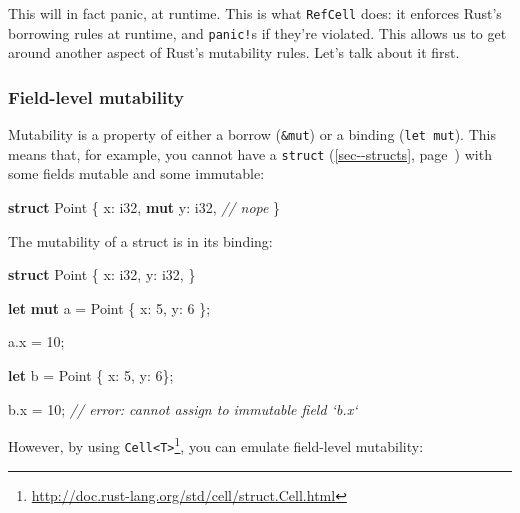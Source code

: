 \documentclass[a4paper,]{book}
\renewcommand*{\hyperref}[2][\ar]{%
  \def\ar{#2}%
  #2 (\autoref{#1}, page~\pageref{#1})}
\newenvironment{Shaded}{\begin{snugshade}}{\end{snugshade}}
\newcommand{\KeywordTok}[1]{\textcolor[rgb]{0.13,0.29,0.53}{\textbf{{#1}}}}
\newcommand{\DataTypeTok}[1]{\textcolor[rgb]{0.13,0.29,0.53}{{#1}}}
\newcommand{\DecValTok}[1]{\textcolor[rgb]{0.00,0.00,0.81}{{#1}}}
\newcommand{\CommentTok}[1]{\textcolor[rgb]{0.56,0.35,0.01}{\textit{{#1}}}}
\newcommand{\NormalTok}[1]{{#1}}
\renewcommand{\href}[2]{#2\footnote{\url{#1}}}
\begin{document}
This will in fact panic, at runtime. This is what \texttt{RefCell} does:
it enforces Rust's borrowing rules at runtime, and \texttt{panic!}s if
they're violated. This allows us to get around another aspect of Rust's
mutability rules. Let's talk about it first.

\subsubsection{Field-level mutability}\label{field-level-mutability}

Mutability is a property of either a borrow (\texttt{\&mut}) or a
binding (\texttt{let\ mut}). This means that, for example, you cannot
have a \hyperref[sec--structs]{\texttt{struct}} with some fields mutable
and some immutable:

\begin{Shaded}
\begin{Highlighting}[]
\KeywordTok{struct} \NormalTok{Point \{}
    \NormalTok{x: }\DataTypeTok{i32}\NormalTok{,}
    \KeywordTok{mut} \NormalTok{y: }\DataTypeTok{i32}\NormalTok{, }\CommentTok{// nope}
\NormalTok{\}}
\end{Highlighting}
\end{Shaded}

The mutability of a struct is in its binding:

\begin{Shaded}
\begin{Highlighting}[]
\KeywordTok{struct} \NormalTok{Point \{}
    \NormalTok{x: }\DataTypeTok{i32}\NormalTok{,}
    \NormalTok{y: }\DataTypeTok{i32}\NormalTok{,}
\NormalTok{\}}

\KeywordTok{let} \KeywordTok{mut} \NormalTok{a = Point \{ x: }\DecValTok{5}\NormalTok{, y: }\DecValTok{6} \NormalTok{\};}

\NormalTok{a.x = }\DecValTok{10}\NormalTok{;}

\KeywordTok{let} \NormalTok{b = Point \{ x: }\DecValTok{5}\NormalTok{, y: }\DecValTok{6}\NormalTok{\};}

\NormalTok{b.x = }\DecValTok{10}\NormalTok{; }\CommentTok{// error: cannot assign to immutable field `b.x`}
\end{Highlighting}
\end{Shaded}

However, by using
\href{http://doc.rust-lang.org/std/cell/struct.Cell.html}{\texttt{Cell\textless{}T\textgreater{}}},
you can emulate field-level mutability:
\end{document}
